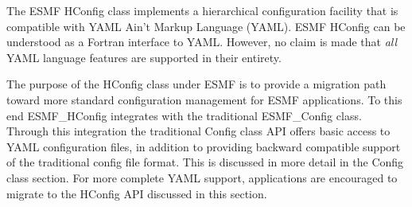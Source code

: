 %

\label{sec:HConfig}

The ESMF HConfig class implements a hierarchical configuration facility that is
compatible with YAML Ain't Markup Language (YAML\texttrademark). ESMF HConfig
can be understood as a Fortran interface to YAML. However, no claim is made that
{\em all} YAML language features are supported in their entirety.

The purpose of the HConfig class under ESMF is to provide a migration path
toward more standard configuration management for ESMF applications. To this end
ESMF\_HConfig integrates with the traditional ESMF\_Config class. Through this
integration the traditional Config class API offers basic access to YAML
configuration files, in addition to providing backward compatible support of the
traditional config file format. This is discussed in more detail in the Config
class section. For more complete YAML support, applications are encouraged to
migrate to the HConfig API discussed in this section.

